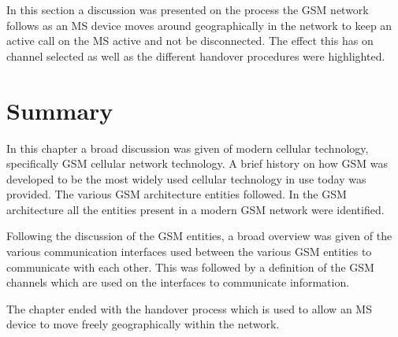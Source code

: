 In this section a discussion was presented on the process the GSM network follows as an MS device moves around geographically in the network to keep an active call on the MS active and not be disconnected. The effect this has on channel selected as well as the different handover procedures were highlighted. 
\section{Summary}
In this chapter a broad discussion was given of modern cellular technology, specifically GSM cellular network technology. A brief history on how GSM was developed to be the most widely used cellular technology in use today was provided. The various GSM architecture entities followed. In the GSM architecture all the entities present in a modern GSM network were identified.

Following the discussion of the GSM entities, a broad overview was given of the various communication interfaces used between the various GSM entities to communicate with each other. This was followed by a definition of the GSM channels which are used on the interfaces to communicate information.

The chapter ended with the handover process which is used to allow an MS device to move freely geographically within the network. 
